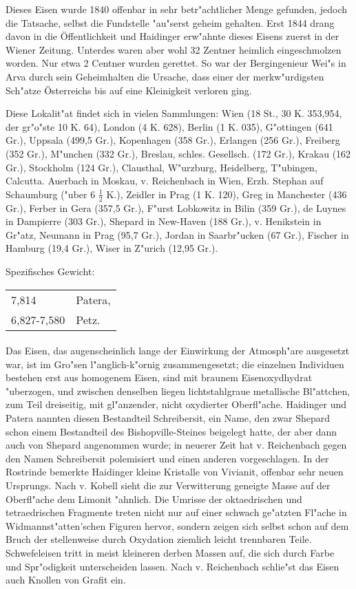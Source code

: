 \documentclass[a4paper, 11pt, oneside]{article}
\begin{document}
Dieses Eisen wurde 1840 offenbar in sehr betr"achtlicher Menge gefunden, jedoch die Tatsache, selbst die Fundstelle "au"serst geheim gehalten. Erst 1844 drang davon in die Öffentlichkeit und Haidinger erw"ahnte dieses Eisens zuerst in der Wiener Zeitung. Unterdes waren aber wohl 32 Zentner heimlich eingeschmolzen worden. Nur etwa 2 Centner wurden gerettet. So war der Bergingenieur Wei"s in Arva durch sein Geheimhalten die Ursache, dass einer der merkw"urdigsten Sch"atze Österreichs bis auf eine Kleinigkeit verloren ging.

Diese Lokalit"at findet sich in vielen Sammlungen: Wien (18 St., 30 K. 353,954, der gr"o"ste 10 K. 64), London (4 K. 628), Berlin (1 K. 035), G"ottingen (641 Gr.), Uppsala (499,5 Gr.), Kopenhagen (358 Gr.), Erlangen (256 Gr.), Freiberg (352 Gr.), M"unchen (332 Gr.), Breslau, schles. Gesellsch. (172 Gr.), Krakau (162 Gr.), Stockholm (124 Gr.), Clausthal, W"urzburg, Heidelberg, T"ubingen, Calcutta. Auerbach in Moskau, v. Reichenbach in Wien, Erzh. Stephan auf Schaumburg ("uber 6 $\frac{1}{2}$ K.), Zeidler in Prag (1 K. 120), Greg in Manchester (436 Gr.), Ferber in Gera (357,5 Gr.), F"urst Lobkowitz in Bilin (359 Gr.), de Luynes in Dampierre (303 Gr.), Shepard in New-Haven (188 Gr.), v. Henikstein in Gr"atz, Neumann in Prag (95,7 Gr.), Jordan in Saarbr"ucken (67 Gr.), Fischer in Hamburg (19,4 Gr.), Wiser in Z"urich (12,95 Gr.).

Spezifisches Gewicht:  
\begin{table}[!ht]
    \centering
    \begin{tabular}{l l}
        7,814 & Patera,\\
        6,827-7,580 & Petz.
    \end{tabular}
\end{table}
\paragraph{}
Das Eisen, das augenscheinlich lange der Einwirkung der Atmosph"are ausgesetzt war, ist im Gro"sen l"anglich-k"ornig zusammengesetzt; die einzelnen Individuen bestehen erst aus homogenem Eisen, sind mit braunem Eisenoxydhydrat "uberzogen, und zwischen denselben liegen lichtstahlgraue metallische Bl"attchen, zum Teil dreiseitig, mit gl"anzender, nicht oxydierter Oberfl"ache. Haidinger und Patera nannten diesen Bestandteil Schreibersit, ein Name, den zwar Shepard schon einem Bestandteil des Bishopville-Steines beigelegt hatte, der aber dann auch von Shepard angenommen wurde; in neuerer Zeit hat v. Reichenbach gegen den Namen Schreibersit polemisiert und einen anderen vorgeschlagen. In der Rostrinde bemerkte Haidinger kleine Kristalle von Vivianit, offenbar sehr neuen Ursprungs. Nach v. Kobell sieht die zur Verwitterung geneigte Masse auf der Oberfl"ache dem Limonit "ahnlich. Die Umrisse der oktaedrischen und tetraedrischen Fragmente treten nicht nur auf einer schwach ge"atzten Fl"ache in Widmannst"atten'schen Figuren hervor, sondern zeigen sich selbst schon auf dem Bruch der stellenweise durch Oxydation ziemlich leicht trennbaren Teile. Schwefeleisen tritt in meist kleineren derben Massen auf, die sich durch Farbe und Spr"odigkeit unterscheiden lassen. Nach v. Reichenbach schlie"st das Eisen auch Knollen von Grafit ein.
\end{document}
